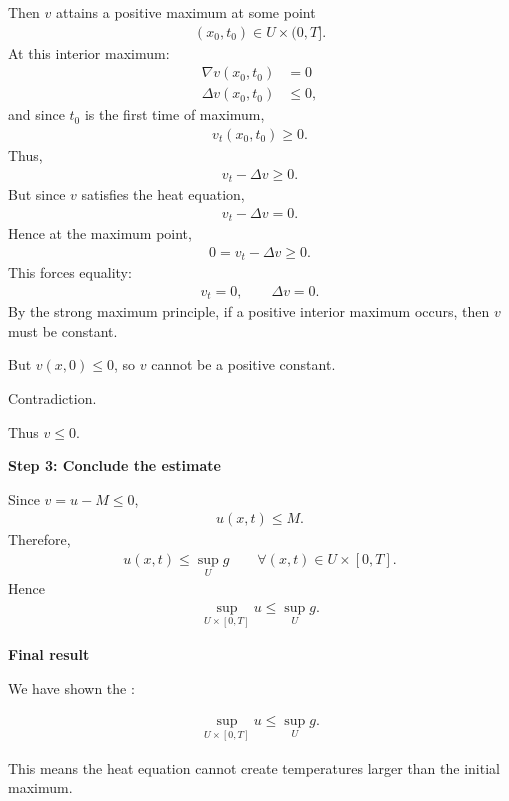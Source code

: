 \documentclass[12pt,a4paper]{report}
\begin{document}
\begin{description}
\begin{description}
Then $v$ attains a positive maximum at some point
\begin{align*}
(x_0,t_0)\in U\times(0,T].
\end{align*}
At this interior maximum:
\begin{align*}
\nabla v(x_0,t_0)&=0\\
\Delta v(x_0,t_0)&\le 0,
\end{align*}
and since $t_0$ is the first time of maximum,
\begin{align*}
v_t(x_0,t_0)\ge 0.
\end{align*}
Thus,
\begin{align*}
v_t-\Delta v\ge 0.
\end{align*}
But since $v$ satisfies the heat equation,
\begin{align*}
v_t-\Delta v=0.
\end{align*}
Hence at the maximum point,
\begin{align*}
0=v_t-\Delta v\ge 0.
\end{align*}
This forces equality:
\begin{align*}
v_t=0,\qquad \Delta v=0.
\end{align*}
By the strong maximum principle, if a positive interior maximum occurs, then $v$ must be constant.

But $v(x,0)\le 0$, so $v$ cannot be a positive constant.

Contradiction.

Thus $v\le 0$.

\item \textbf{Step 3: Conclude the estimate}

Since $v=u-M\le 0$,
\begin{align*}
u(x,t)\le M.
\end{align*}
Therefore,
\begin{align*}
u(x,t)\le \sup_U g
\qquad\forall (x,t)\in U\times[0,T].
\end{align*}
Hence
\begin{align*}
\boxed{
\sup_{U\times[0,T]}u\le \sup_U g.
}
\end{align*}

\item \textbf{Final result}

We have shown the :

\begin{align*}
\boxed{
\sup_{U\times[0,T]}u \le \sup_U g.
}
\end{align*}

This means the heat equation cannot create temperatures larger than the initial maximum.


\end{description}
\end{description}
\end{document}

